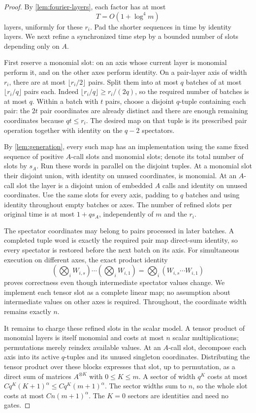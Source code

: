 \begin{proof}
By \cref{lem:fourier-layers}, each factor has at most
\[
 T=O(1+\log^4m)
\]
layers, uniformly for these $r_i$.  Pad the shorter sequences in
time by identity layers.  We next refine a synchronized time step by
a bounded number of slots depending only on $A$.

First reserve a monomial slot: on an axis whose current layer is
monomial perform it, and on the other axes perform identity.  On a
pair-layer axis of width $r_i$, there are at most
$\lfloor r_i/2\rfloor$ pairs.  Split them into at most $q$ batches
of at most $\lfloor r_i/q\rfloor$ pairs each.  Indeed
$\lfloor r_i/q\rfloor\ge r_i/(2q)$, so the required number of
batches is at most $q$.  Within a batch with $t$ pairs, choose a
disjoint $q$-tuple containing each pair: the $2t$ pair coordinates
are already distinct and there are enough remaining coordinates
because $qt\le r_i$.  The desired map on that tuple is its prescribed
pair operation together with identity on the $q-2$ spectators.

By \cref{lem:generation}, every such map has an implementation using
the same fixed sequence of positive $A$-call slots and monomial
slots; denote its total number of slots by $s_A$.  Run these words in
parallel on the disjoint tuples.  At a
monomial slot their disjoint union, with identity on unused
coordinates, is monomial.  At an $A$-call slot the layer is a disjoint
union of embedded $A$ calls and identity on unused coordinates.
Use the same slots for every axis, padding to $q$ batches and using
identity throughout empty batches or axes.  The number of refined
slots per original time is at most $1+qs_A$, independently of $m$
and the $r_i$.

The spectator coordinates may belong to pairs processed in later
batches.  A completed tuple word is exactly the required pair map
direct-sum identity, so every spectator is restored before the next
batch on its axis.  For simultaneous execution on different axes,
the exact product identity
\begin{equation}\label{fft:synchronized-products}
 (\bigotimes_i W_{i,s})\cdots(\bigotimes_i W_{i,1})
       =\bigotimes_i(W_{i,s}\cdots W_{i,1})
\end{equation}
proves correctness even though intermediate spectator values change.
We implement each tensor slot as a complete linear map; no assumption
about intermediate values on other axes is required.  Throughout,
the coordinate width remains exactly $n$.

It remains to charge these refined slots in the scalar model.  A
tensor product of monomial layers is itself monomial and costs at
most $n$ scalar multiplications; permutations merely reindex
available values.  At an $A$-call slot, decompose each axis into its
active $q$-tuples and its unused singleton coordinates.  Distributing
the tensor product over these blocks expresses that slot, up to
permutation, as a direct sum of matrices $A^{\otimes K}$ with
$0\le K\le m$.  A sector of width $q^K$ costs at most
$Cq^K(K+1)^\alpha\le Cq^K(m+1)^\alpha$.  The sector widths sum
to $n$, so the whole slot costs at most $Cn(m+1)^\alpha$.
The $K=0$ sectors are identities and need no gates.


\end{proof}
